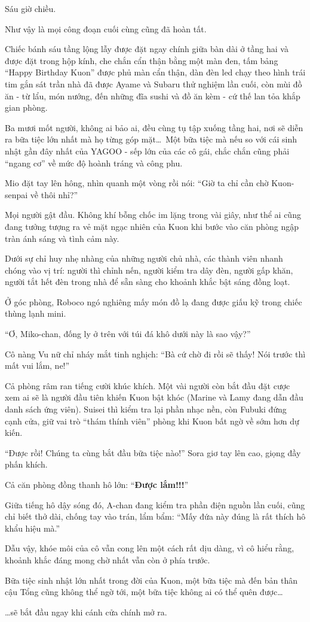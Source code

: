 \documentclass[../main.tex]{subfiles}
\begin{document}
\ct

Sáu giờ chiều.

Như vậy là mọi công đoạn cuối cùng cũng đã hoàn tất.

Chiếc bánh sáu tầng lộng lẫy được đặt ngay chính giữa bàn dài ở tầng hai và được đặt trong hộp kính, che chắn cẩn thận bằng một màn đen, tấm bảng ``Happy Birthday Kuon'' được phủ màn cẩn thận, dàn đèn led chạy theo hình trái tim gắn sát trần nhà đã được Ayame và Subaru thử nghiệm lần cuối, còn mùi đồ ăn - từ lẩu, món nướng, đến những đĩa sushi và đồ ăn kèm - cứ thế lan tỏa khắp gian phòng.

Ba mươi mốt người, không ai bảo ai, đều cùng tụ tập xuống tầng hai, nơi sẽ diễn ra bữa tiệc lớn nhất mà họ từng góp mặt\dots\ Một bữa tiệc mà nếu so với cái sinh nhật gần đây nhất của YAGOO - sếp lớn của các cô gái, chắc chắn cũng phải ``ngang cơ'' về mức độ hoành tráng và công phu.

Mio đặt tay lên hông, nhìn quanh một vòng rồi nói: ``Giờ ta chỉ cần chờ Kuon-senpai về thôi nhỉ?''

Mọi người gật đầu. Không khí bỗng chốc im lặng trong vài giây, như thể ai cũng đang tưởng tượng ra vẻ mặt ngạc nhiên của Kuon khi bước vào căn phòng ngập tràn ánh sáng và tình cảm này.

Dưới sự chỉ huy nhẹ nhàng của những người chủ nhà, các thành viên nhanh chóng vào vị trí: người thì chỉnh nến, người kiểm tra dây đèn, người gấp khăn, người tắt hết đèn trong nhà để sẵn sàng cho khoảnh khắc bật sáng đồng loạt.

Ở góc phòng, Roboco ngó nghiêng mấy món đồ lạ đang được giấu kỹ trong chiếc thùng lạnh mini.

``Ơ, Miko-chan, đống ly ở trên với túi đá khô dưới này là sao vậy?''

Cô nàng Vu nữ chỉ nháy mắt tinh nghịch: ``Bà cứ chờ đi rồi sẽ thấy! Nói trước thì mất vui lắm, ne!''

Cả phòng râm ran tiếng cười khúc khích. Một vài người còn bắt đầu đặt cược xem ai sẽ là người đầu tiên khiến Kuon bật khóc (Marine và Lamy đang dẫn đầu danh sách ứng viên). Suisei thì kiểm tra lại phần nhạc nền, còn Fubuki đứng cạnh cửa, giữ vai trò ``thám thính viên'' phòng khi Kuon bất ngờ về sớm hơn dự kiến.

``Được rồi! Chúng ta cùng bắt đầu bữa tiệc nào!'' Sora giơ tay lên cao, giọng đầy phấn khích.

Cả căn phòng đồng thanh hô lớn: ``\textbf{Được lắm!!!}''

Giữa tiếng hô dậy sóng đó, A-chan đang kiểm tra phần điện nguồn lần cuối, cũng chỉ biết thở dài, chống tay vào trán, lẩm bẩm: ``Mấy đứa này đúng là rất thích hô khẩu hiệu mà.''

Dẫu vậy, khóe môi của cô vẫn cong lên một cách rất dịu dàng, vì cô hiểu rằng, khoảnh khắc đáng mong chờ nhất vẫn còn ở phía trước.

Bữa tiệc sinh nhật lớn nhất trong đời của Kuon, một bữa tiệc mà đến bản thân cậu Tổng cũng không thể ngờ tới, một bữa tiệc không ai có thể quên được\dots

\dots sẽ bắt đầu ngay khi cánh cửa chính mở ra.
\end{document}

